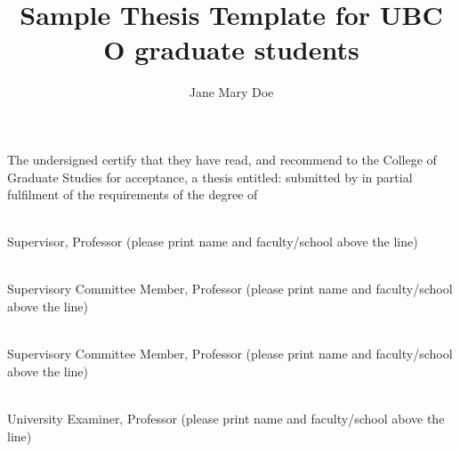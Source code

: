 \documentclass[msc,oneside]{ubcthesis}%
\title{Sample Thesis Template for UBC O graduate students}
\author{Jane Mary Doe} %
\begin{document}
\frontmatter                    %

\maketitle                      %

\makeatletter
The undersigned certify that they have read, and recommend to the College of Graduate Studies for acceptance, a thesis entitled: {\sc \@title }
submitted by {\sc \@author} in partial fulfilment of the requirements of the degree of \@degreetitle
\makeatother

\newlength{\linespace}
\setlength{\linespace}{.75cm} %
\vspace{\linespace}\smaller

\noindent\underline{\hspace{30em}} \\
Supervisor, Professor (please print name and faculty/school above the line)

\vspace{\linespace}

\noindent\underline{\hspace{30em}} \\
Supervisory Committee Member, Professor (please print name and faculty/school above the line)

\vspace{\linespace}

\noindent\underline{\hspace{30em}} \\
Supervisory Committee Member, Professor (please print name and faculty/school above the line)

\vspace{\linespace}

\noindent\underline{\hspace{30em}} \\
University Examiner, Professor (please print name and faculty/school above the line)

\vspace{\linespace}
\end{document}
